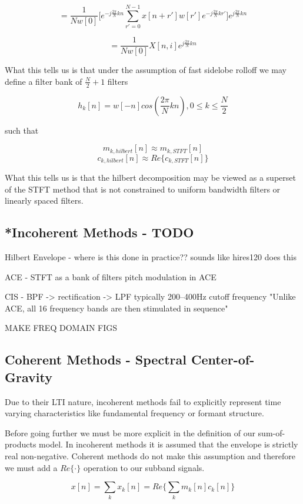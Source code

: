 \documentclass [11pt, proquest] {uwthesis}[2015/03/03]
\begin{document}
$$= \frac{1}{Nw[0]}\bigg[e^{-j\frac{2\pi}{N}kn} \sum\limits_{r'=0}^{N-1} x[n + r'] w[r'] e^{-j\frac{2\pi}{N}kr'}\bigg]e^{j\frac{2\pi}{N}kn}$$

$$ = \frac{1}{Nw[0]}X[n,i]e^{j\frac{2\pi}{N}kn}$$



What this tells us is that under the assumption of fast sidelobe rolloff we may define a filter bank of $\frac{N}{2} + 1$ filters

$$h_k[n] = w[-n]cos(\frac{2\pi}{N}kn), 0 \leq k \leq \frac{N}{2}$$

such that

$$m_{k,hilbert}[n] \approx m_{k,STFT}[n]$$
$$c_{k,hilbert}[n] \approx Re\{c_{k,STFT}[n]\}$$

What this tells us is that the hilbert decomposition may be viewed as a superset of the STFT method that is not constrained to uniform bandwidth filters or linearly spaced filters.

\subsection{*Incoherent Methods - TODO}

Hilbert Envelope - where is this done in practice??
	sounds like hires120 does this

ACE - STFT as a bank of filters
pitch modulation in ACE


CIS - BPF -> rectification -> LPF   
	typically 200–400Hz cutoff frequency
	"Unlike ACE, all 16 frequency bands are then stimulated in sequence"


MAKE FREQ DOMAIN FIGS


\subsection{Coherent Methods - Spectral Center-of-Gravity}

Due to their LTI nature, incoherent methods fail to explicitly represent time varying characteristics like fundamental frequency or formant structure. \cite{wilson1993design}

Before going further we must be more explicit in the definition of our sum-of-products model.  In incoherent methods it is assumed that the envelope is strictly real non-negative.  Coherent methods do not make this assumption and therefore we must add a $Re\{\cdot\}$ operation to our subband signals.

$$x[n] = \sum\limits_k x_k[n] = Re\bigg\{ \sum\limits_k m_k[n] c_k[n] \bigg\}$$
\end{document}
